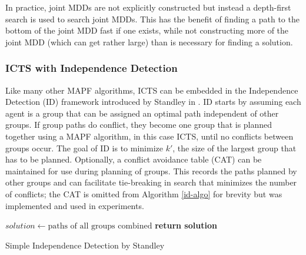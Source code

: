 \documentclass[english]{article}
\begin{document}
	In practice, joint MDDs are not explicitly constructed but instead a depth-first search is used to search joint MDDs. This has the benefit of finding a path to the bottom of the joint MDD fast if one exists, while not constructing more of the joint MDD (which can get rather large) than is necessary for finding a solution.
	\subsubsection{ICTS with Independence Detection}
	Like many other MAPF algorithms, ICTS can be embedded in the Independence Detection (ID) framework introduced by Standley in \cite{standley2010}. ID starts by assuming each agent is a group that can be assigned an optimal path independent of other groups. If group paths do conflict, they become one group that is planned together using a MAPF algorithm, in this case ICTS, until no conflicts between groups occur. The goal of ID is to minimize $k'$, the size of the largest group that has to be planned. Optionally, a conflict avoidance table (CAT) can be maintained for use during planning of groups. This records the paths planned by other groups and can facilitate tie-breaking in search that minimizes the number of conflicts; the CAT is omitted from Algorithm \ref{id-algo} for brevity but was implemented and used in experiments.
	\begin{algorithm}
	\begin{algorithmic}[1]
		\State {}
		\State {}
		\Repeat
			\State {}
			\State {}
			\State {}
		\State $solution\gets\text{paths of all groups combined}$
		\State \textbf{return solution}
	\end{algorithmic}
	\caption{Simple Independence Detection by Standley} 
	\label{id-algo}
	\end{algorithm}
\end{document}
